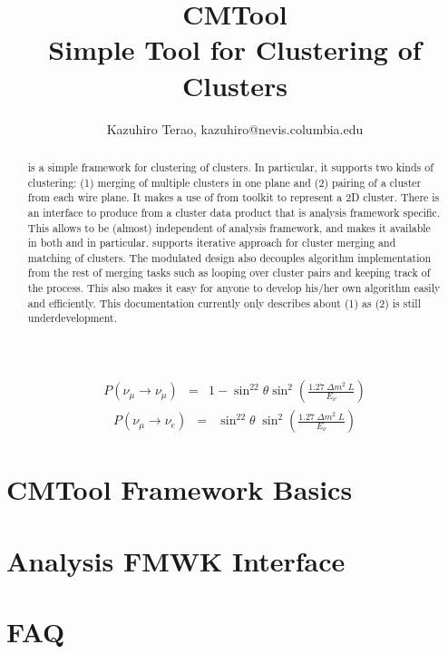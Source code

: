 \documentclass[a4paper,12pt]{report}
\begin{document}
\title{CMTool \\ \vspace{0.1in} Simple Tool for Clustering of Clusters}
\author{Kazuhiro Terao, kazuhiro@nevis.columbia.edu}
\maketitle

\begin{abstract}
{\cmtool} is a simple framework for clustering of clusters. In particular, it supports two kinds of clustering: (1) merging of multiple clusters in one plane and (2) pairing of a cluster from each wire plane. It makes a use of {\cpan} from {\cru} toolkit to represent a 2D cluster. There is an interface to produce {\cpan} from a cluster data product that is analysis framework specific. This allows {\cmtool} to be (almost) independent of analysis framework, and makes it available in both {\larsoft} and {\larlight} in particular. {\cmtool} supports iterative approach for cluster merging and matching of clusters. The modulated design also decouples algorithm implementation from the rest of merging tasks such as looping over cluster pairs and keeping track of the process. This also makes it easy for anyone to develop his/her own algorithm easily and efficiently. This documentation currently only describes about (1) as (2) is still underdevelopment. 
\end{abstract}

\tableofcontents

\newpage

\begin{eqnarray*}
P(\nu_\mu\rightarrow\nu_\mu) &=& 1-\sin^22\theta\sin^2\left(\frac{1.27\;\Delta m^2\; L}{E_\nu}\right)
\end{eqnarray*}
\begin{eqnarray*}
P(\nu_\mu\rightarrow\nu_e) &=& \sin^22\theta\;\sin^2\left(\frac{1.27\;\Delta m^2\; L}{E_\nu}\right)
\end{eqnarray*}

\chapter{{\ttfamily CMTool} Framework Basics}
\label{chap:basics}


\chapter{Analysis FMWK Interface}
\label{chap:fmwk_interface}



\chapter{FAQ}
\label{chap:faq}





\end{document}
